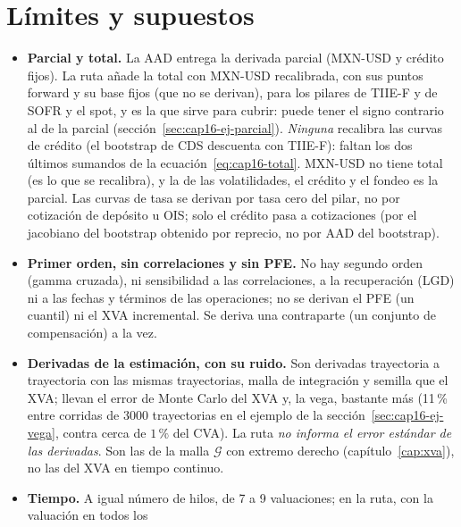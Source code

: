 \section{Límites y supuestos}\label{sec:cap16-limites}

\begin{limites}
  \begin{itemize}
    \item \textbf{Parcial y total.} La AAD entrega la derivada parcial (MXN-USD y crédito fijos). La ruta añade la total
          con MXN-USD recalibrada, con sus puntos forward y su base fijos (que no se derivan), para los pilares de TIIE-F y de
          SOFR y el spot, y es la que sirve para cubrir: puede tener el signo contrario al de la parcial
          (sección~\ref{sec:cap16-ej-parcial}). \emph{Ninguna} recalibra las curvas de crédito (el bootstrap de CDS
          descuenta con TIIE-F): faltan los dos últimos sumandos de la ecuación~\eqref{eq:cap16-total}. MXN-USD no tiene
          total (es lo que se recalibra), y la de las volatilidades, el crédito y el fondeo es la parcial. Las curvas de tasa se derivan por tasa cero del pilar, no por
          cotización de depósito u OIS; solo el crédito pasa a cotizaciones (por el jacobiano del bootstrap
          obtenido por reprecio, no por AAD del bootstrap).
    \item \textbf{Primer orden, sin correlaciones y sin PFE.} No hay segundo orden (gamma cruzada), ni sensibilidad a
          las correlaciones, a la recuperación (LGD) ni a las fechas y términos de las operaciones; no se derivan el
          PFE (un cuantil) ni el XVA incremental. Se deriva una contraparte (un conjunto de compensación) a la vez.
    \item \textbf{Derivadas de la estimación, con su ruido.} Son derivadas trayectoria a trayectoria con las mismas
          trayectorias, malla de integración y semilla que el XVA; llevan el error de Monte Carlo del XVA y, la vega,
          bastante más (11\,\% entre corridas de 3000 trayectorias en el ejemplo de la
          sección~\ref{sec:cap16-ej-vega}, contra cerca de $1\,\%$ del CVA). La ruta \emph{no informa el error estándar de las derivadas}. Son las de la malla $\mathcal G$ con
          extremo derecho (capítulo~\ref{cap:xva}), no las del XVA en tiempo continuo.
    \item \textbf{Tiempo.} A igual número de hilos, de 7 a 9 valuaciones; en la ruta, con la valuación en todos los

\end{itemize}
\end{limites}
